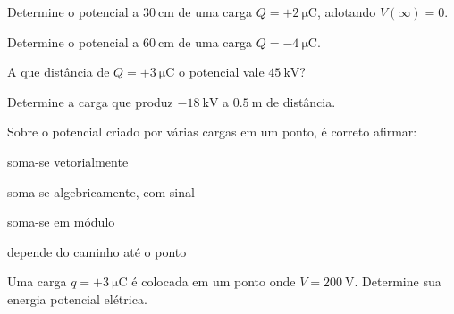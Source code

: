 \blocofixacao
\begin{questao}[1]{}

Determine o potencial a $\SI{30}{\centi\meter}$ de uma carga
$Q=+\SI{2}{\micro\coulomb}$, adotando $V(\infty)=0$.


\end{questao}
\begin{questao}[1]{}

Determine o potencial a $\SI{60}{\centi\meter}$ de uma carga
$Q=-\SI{4}{\micro\coulomb}$.


\end{questao}
\begin{questao}[1]{}

A que distância de $Q=+\SI{3}{\micro\coulomb}$ o potencial vale
$\SI{45}{\kilo\volt}$?


\end{questao}
\begin{questao}[1]{}

Determine a carga que produz $\SI{-18}{\kilo\volt}$ a
$\SI{0.5}{\meter}$ de distância.


\end{questao}
\begin{questao}[1]{}

Sobre o potencial criado por várias cargas em um ponto, é correto afirmar:
\begin{alternativas}[2]
\item soma-se vetorialmente
\item soma-se algebricamente, com sinal
\item soma-se em módulo
\item depende do caminho até o ponto
\end{alternativas}


\end{questao}
\begin{questao}[1]{}

Uma carga $q=+\SI{3}{\micro\coulomb}$ é colocada em um ponto onde
$V=\SI{200}{\volt}$. Determine sua energia potencial elétrica.


\end{questao}

